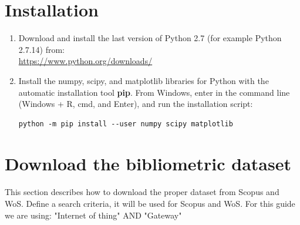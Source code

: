 \documentclass[10pt,letterpaper]{article}
\begin{document}
\section{Installation}

\begin{enumerate}
\item Download and install the last version of Python 2.7 (for example Python 2.7.14) from: \\ \url{https://www.python.org/downloads/}
\item Install the  numpy, scipy, and matplotlib  libraries for Python with the automatic installation tool \textbf{pip}. From Windows, enter in the command line (Windows + R, cmd, and Enter), and run the installation script:
\begin{verbatim}
python -m pip install --user numpy scipy matplotlib
\end{verbatim}
\end{enumerate}


\section{Download the bibliometric dataset}
This section describes how to download the proper dataset from Scopus and WoS. Define a search criteria, it will be used for Scopus and WoS. For this guide we are using: "Internet of thing"  AND  "Gateway" 
\end{document}

